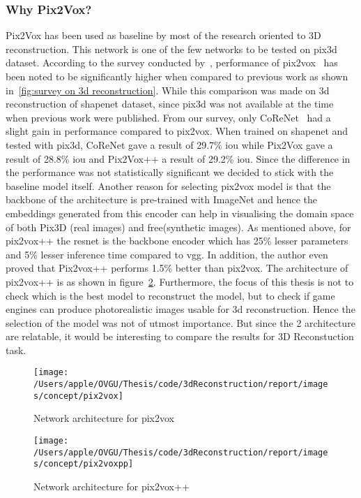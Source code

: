 \subsubsection{Why Pix2Vox?}
Pix2Vox has been used as baseline by most of the research oriented to 3D reconstruction.
This network is one of the few networks to be tested on pix3d dataset.
According to the survey conducted by~\cite{Han2021ImageBased3O}, performance of pix2vox~\cite{Xie_2019}
has been noted to be significantly higher when compared to previous work  as shown in~\ref{fig:survey on 3d reconstruction}.
While this comparison was made on 3d reconstruction of shapenet dataset, since pix3d was not available at the time when previous work were published.
From our survey, only CoReNet~\cite{popov2020corenet} had a slight gain in performance compared to pix2vox.
When trained on shapenet and tested with pix3d, CoReNet gave a result of 29.7\% \gls{iou} while Pix2Vox gave a result of 28.8\% \gls{iou}  and Pix2Vox++ a result of 29.2\% \gls{iou}\@.
Since the difference in the performance was not statistically significant we decided to stick with the baseline model itself.
Another reason for selecting pix2vox model is that the backbone of the architecture is pre-trained with ImageNet and
hence the embeddings generated from this encoder can help in visualising the domain space of both Pix3D (real images) and \gls{free}(synthetic images).
As mentioned above, for pix2vox++ the \gls{resnet} is the backbone encoder which has 25\% lesser parameters and 5\% lesser inference time compared to \gls{vgg}\@.
In addition, the author even proved that Pix2vox++ performs 1.5\% better than pix2vox.
The architecture of pix2vox++ is as shown in figure~\ref{fig:pix2voxpp architecture}.
Furthermore, the focus of this thesis is not to check which is the best model to reconstruct the model, but to check if game engines can produce photorealistic images usable for 3d reconstruction.
Hence the selection of the model was not of utmost importance.
But since the 2 architecture are relatable, it would be interesting to compare the results for 3D Reconstuction task.
\begin{figure}
    \centering
    \texttt{[image: /Users/apple/OVGU/Thesis/code/3dReconstruction/report/images/concept/pix2vox]}
    \caption{Network architecture for pix2vox~\cite{Xie_2019}}
    \label{fig:pix2vox architecture}
\end{figure}

\begin{figure}
    \centering
    \texttt{[image: /Users/apple/OVGU/Thesis/code/3dReconstruction/report/images/concept/pix2voxpp]}
    \caption{Network architecture for pix2vox++~\cite{Xie_2020}}
    \label{fig:pix2voxpp architecture}
\end{figure}


